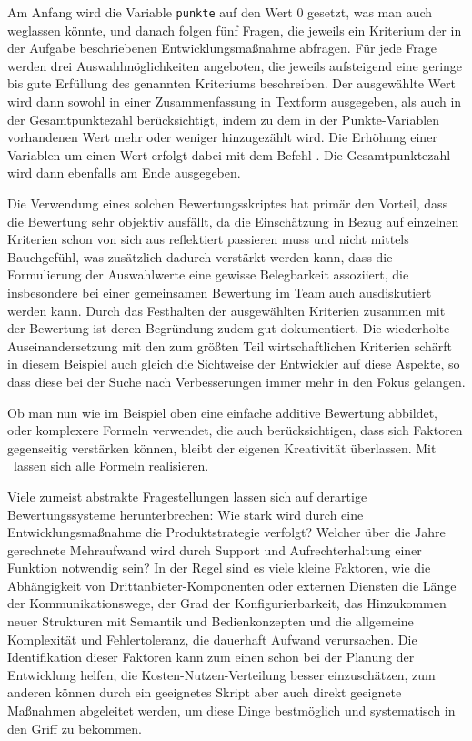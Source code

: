 Am Anfang wird die Variable \verb|punkte| auf den Wert 0 gesetzt, was man auch weglassen könnte, und danach folgen fünf Fragen, die jeweils ein Kriterium der in der Aufgabe beschriebenen Entwicklungsmaßnahme abfragen. Für jede Frage werden drei Auswahlmöglichkeiten angeboten, die jeweils aufsteigend eine geringe bis gute Erfüllung des genannten Kriteriums beschreiben. Der ausgewählte Wert wird dann sowohl in einer Zusammenfassung in Textform ausgegeben, als auch in der Gesamtpunktezahl berücksichtigt, indem zu dem in der Punkte-Variablen vorhandenen Wert mehr oder weniger hinzugezählt wird. Die Erhöhung einer Variablen um einen Wert erfolgt dabei mit dem Befehl . Die Gesamtpunktezahl wird dann ebenfalls am Ende ausgegeben.

Die Verwendung eines solchen Bewertungsskriptes hat primär den Vorteil, dass die Bewertung sehr objektiv ausfällt, da die Einschätzung in Bezug auf einzelnen Kriterien schon von sich aus reflektiert passieren muss und nicht mittels Bauchgefühl, was zusätzlich dadurch verstärkt werden kann, dass die Formulierung der Auswahlwerte eine gewisse Belegbarkeit assoziiert, die insbesondere bei einer gemeinsamen Bewertung im Team auch ausdiskutiert werden kann. Durch das Festhalten der ausgewählten Kriterien zusammen mit der Bewertung ist deren Begründung zudem gut dokumentiert. Die wiederholte Auseinandersetzung mit den zum größten Teil wirtschaftlichen Kriterien schärft in diesem Beispiel auch gleich die Sichtweise der Entwickler auf diese Aspekte, so dass diese bei der Suche nach Verbesserungen immer mehr in den Fokus gelangen.

Ob man nun wie im Beispiel oben eine einfache additive Bewertung abbildet, oder komplexere Formeln verwendet, die auch berücksichtigen, dass sich Faktoren gegenseitig verstärken können, bleibt der eigenen Kreativität überlassen. Mit \FPZ\ lassen sich alle Formeln realisieren.

Viele zumeist abstrakte Fragestellungen lassen sich auf derartige Bewertungssysteme herunterbrechen: Wie stark wird durch eine Entwicklungsmaßnahme die Produktstrategie verfolgt? Welcher über die Jahre gerechnete Mehraufwand wird durch Support und Aufrechterhaltung einer Funktion notwendig sein?
In der Regel sind es viele kleine Faktoren, wie die Abhängigkeit von Drittanbieter-Komponenten oder externen Diensten die Länge der Kommunikationswege, der Grad der Konfigurierbarkeit, das Hinzukommen neuer Strukturen mit Semantik und Bedienkonzepten und die allgemeine Komplexität und Fehlertoleranz, die dauerhaft Aufwand verursachen. Die Identifikation dieser Faktoren kann zum einen schon bei der Planung der Entwicklung helfen, die Kosten-Nutzen-Verteilung besser einzuschätzen, zum anderen können durch ein geeignetes Skript aber auch direkt geeignete Maßnahmen abgeleitet werden, um diese Dinge bestmöglich und systematisch in den Griff zu bekommen.

